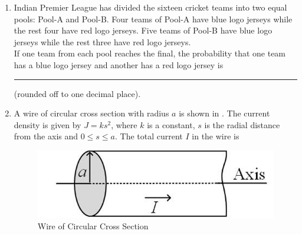 \documentclass[journal,12pt,onecolumn]{IEEEtran}
\theoremstyle{remark}
\begin{document}
\begin{enumerate}
\item Indian Premier League has divided the sixteen cricket teams into two equal pools: Pool-A and Pool-B. Four teams of Pool-A have blue logo jerseys while the rest four have red logo jerseys. Five teams of Pool-B have blue logo jerseys while the rest three have red logo jerseys.\\
If one team from each pool reaches the final, the probability that one team has a blue logo jersey and another has a red logo jersey is \rule{1.5cm}{0.4pt} (rounded off to one decimal place).
\par\hfill{}

\item A wire of circular cross section with radius $a$ is shown in . The current density is given by $J = k s^2$, where $k$ is a constant, $s$ is the radial distance from the axis and $0 \leq s \leq a$. The total current $I$ in the wire is
\par\hfill{}
\begin{figure}[H]
    \centering
    \includegraphics[width=0.4\columnwidth]{Figs/Q-36.png}
    \caption{Wire of Circular Cross Section}
    \label{36}
\end{figure}
    \begin{enumerate}
    \end{enumerate}


\end{enumerate}
\end{document}
